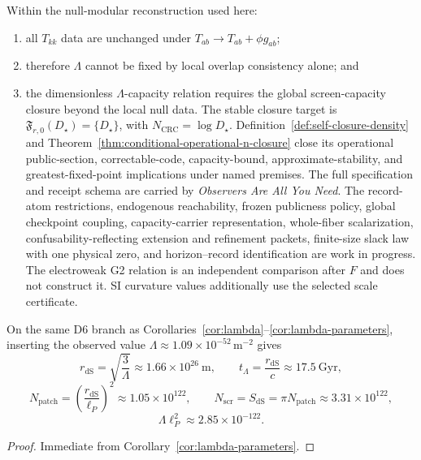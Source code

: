 \begin{theorem}
Within the null-modular reconstruction used here:
\begin{enumerate}[leftmargin=2em]
\item all \(T_{kk}\) data are unchanged under \(T_{ab}\to T_{ab}+\phi g_{ab}\);
\item therefore \(\Lambda\) cannot be fixed by local overlap consistency alone; and
\item the dimensionless \(\Lambda\)-capacity relation requires the global
screen-capacity closure beyond the local null data. The stable closure target is
\(\mathfrak F_{r,0}(D_\star)=\{D_\star\}\), with
\(N_{\mathrm{CRC}}=\log D_\star\). Definition~\ref{def:self-closure-density}
and Theorem~\ref{thm:conditional-operational-n-closure} close its operational
public-section, correctable-code, capacity-bound, approximate-stability, and
greatest-fixed-point implications under named premises. The full specification
and receipt schema are carried by \emph{Observers Are All You Need}. The
record-atom restrictions, endogenous reachability, frozen publicness policy,
global checkpoint coupling, capacity-carrier representation, whole-fiber
scalarization, confusability-reflecting extension and refinement packets,
finite-size slack law with one physical zero, and horizon--record identification
are work in progress.
The electroweak G2 relation is an independent comparison after \(F\) and does
not construct it. SI curvature values additionally use the selected scale
certificate.
\end{enumerate}
\end{theorem}

\begin{corollary}\label{cor:lambda-benchmark}
On the same D6 branch as Corollaries~\ref{cor:lambda}--\ref{cor:lambda-parameters}, inserting the observed value \(\Lambda\approx 1.09\times 10^{-52}\,\mathrm{m^{-2}}\) gives
\[
r_{\mathrm{dS}}=\sqrt{\frac{3}{\Lambda}}\approx 1.66\times 10^{26}\ \mathrm{m},
\qquad
t_\Lambda=\frac{r_{\mathrm{dS}}}{c}\approx 17.5\ \mathrm{Gyr},
\]
\[
N_{\mathrm{patch}}=\left(\frac{r_{\mathrm{dS}}}{\ell_P}\right)^2
\approx 1.05\times 10^{122},
\qquad
N_{\mathrm{scr}}=S_{\mathrm{dS}}=\pi N_{\mathrm{patch}}
\approx 3.31\times 10^{122},
\]
\[
\Lambda\ell_P^2\approx 2.85\times10^{-122}.
\]
\end{corollary}

\begin{proof}
Immediate from Corollary~\ref{cor:lambda-parameters}.
\end{proof}

